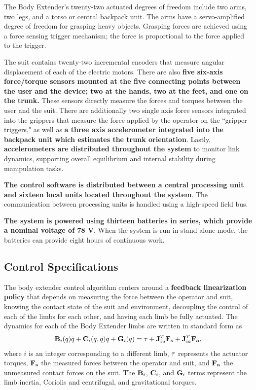 \begin{refsection}
 The Body Extender's twenty-two actuated degrees of freedom include two arms, two legs, and a torso or central backpack unit.   The arms have a servo-amplified degree of freedom for grasping heavy objects.  Grasping forces are achieved using a force sensing trigger mechanism; the force is proportional to the force applied to the trigger.
 
 The suit contains twenty-two incremental encoders that measure angular displacement of each of the electric motors.  There are also {\bf five six-axis force/torque sensors mounted at the five connecting points between the user and the device; two at the hands, two at the feet, and one on the trunk.}  These sensors directly measure the forces and torques between the user and the suit.  There are additionally two single axis force sensors integrated into the grippers that measure the force applied by the operator on the ``gripper triggers," as well as {\bf a three axis accelerometer integrated into the backpack unit which estimates the trunk orientation}.  Lastly, \textbf{accelerometers are distributed throughout the system} to monitor link dynamics, supporting overall equilibrium and internal stability during manipulation tasks.   
 
{\bf The control software is distributed between a central processing unit and sixteen local units located throughout the system}.  The communication between processing units is handled using a high-speed field bus.
 
{\bf The system is powered using thirteen batteries in series, which provide a nominal voltage of 78 V}.  When the system is run in stand-alone mode, the batteries can provide eight hours of continuous work.
 
 
 \subsection{Control Specifications}
 
 The body extender control algorithm centers around a {\bf feedback linearization policy} that depends on measuring the force between the operator and suit, knowing the contact state of the suit and environment, decoupling the control of each of the limbs for each other, and having each limb be fully actuated.  The dynamics for each of the Body Extender limbs are written in standard form as  
\begin{equation}
{\bf B}_i(q) \ddot{q} + {\bf C}_i(q,\dot{q})\dot{q} + {\bf G}_i(q) = {\bf \tau} + {\bf J}^T_{iu}{\bf F_s} + {\bf J}^T_{ia}{\bf F_a},
\end{equation}
where $i$ is an integer corresponding to a different limb, ${\bf \tau}$ represents the actuator torques, ${\bf F_s}$ the measured forces between the operator and suit, and ${\bf F_a}$ the unmeasured contact forces on the suit.  The ${\bf B}_i$, ${\bf C}_i$, and ${\bf G}_i$ terms represent the limb inertia, Coriolis and centrifugal, and gravitational torques.  


\end{refsection}
